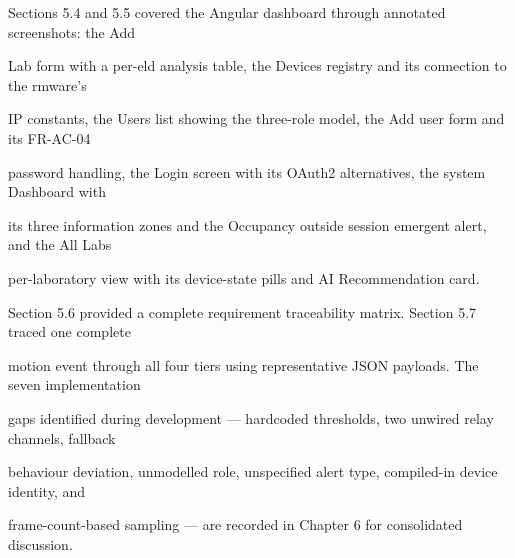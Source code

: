 Sections 5.4 and 5.5 covered the Angular dashboard through annotated screenshots: the Add

Lab form with a per-eld analysis table, the Devices registry and its connection to the rmware's

IP constants, the Users list showing the three-role model, the Add user form and its FR-AC-04

password handling, the Login screen with its OAuth2 alternatives, the system Dashboard with

its three information zones and the Occupancy outside session emergent alert, and the All Labs

per-laboratory view with its device-state pills and AI Recommendation card.

Section 5.6 provided a complete requirement traceability matrix. Section 5.7 traced one complete

motion event through all four tiers using representative JSON payloads. The seven implementation

gaps identified during development --- hardcoded thresholds, two unwired relay channels, fallback

behaviour deviation, unmodelled role, unspecified alert type, compiled-in device identity, and

frame-count-based sampling --- are recorded in Chapter 6 for consolidated discussion.


